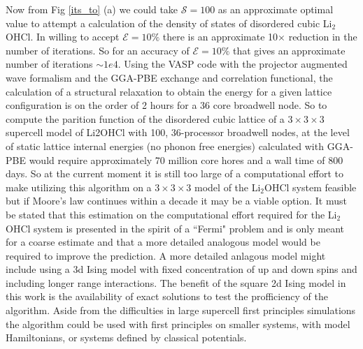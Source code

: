 \documentclass[aps,prl,reprint,superscriptaddress,showkeys]{revtex4-1}
\begin{document}
 Now from Fig \ref{its_to} (a) we could take $\mathcal{S}=100$  as an approximate optimal value to attempt a calculation of the density of states of disordered cubic Li$_2$OHCl. In willing to accept $\mathcal{E}=10\%$ there is an approximate 10$\times$ reduction in the number of iterations. So for an accuracy of $\mathcal{E}=10\%$ that gives an approximate number of iterations  $\sim 1e4$. Using the VASP code\cite{Vasp1,Vasp2,Vasp3,Vasp4} with the projector augmented wave formalism\cite{Blochl, pawVasp} and the GGA-PBE exchange and correlation functional\cite{PBE,PBEerratum}, the calculation of a structural relaxation to obtain the energy for a given lattice configuration is on the order of 2 hours for a 36 core broadwell node. So to compute the parition function of the disordered cubic lattice of a $3\times 3 \times 3$ supercell model of Li2OHCl with 100,  36-processor broadwell nodes, at the level of static lattice internal energies (no phonon free energies) calculated with GGA-PBE  would require approximately  70 million core hores and a wall time of 800 days.   So at the current moment it is still  too large of a computational effort to make utilizing this algorithm on a $3\times  3 \times 3$ model of the Li$_2$OHCl system feasible but if Moore's law continues within a decade it may be a viable option. It must be stated that this estimation on the computational effort required for the Li$_2$OHCl system is presented in the spirit of a ``Fermi" problem and is only meant for a coarse estimate and that a more detailed analogous model would be required to improve the prediction. A more detailed anlagous model might include using a 3d Ising model with fixed concentration of up and down spins and including longer range interactions. The benefit of the square 2d Ising model in this work is the availability of exact solutions to test the profficiency of the algorithm. Aside from the difficulties in large supercell first principles simulations the algorithm could be used with first principles on smaller systems, with model Hamiltonians, or systems defined by classical potentials.  
\end{document}
